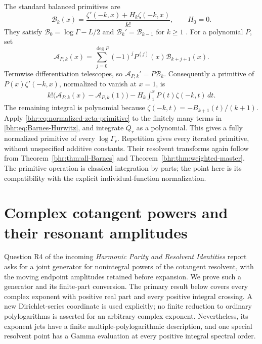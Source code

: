 \documentclass[11pt]{article}
\numberwithin{equation}{section}
\theoremstyle{plain}
\theoremstyle{definition}
\theoremstyle{remark}
\begin{document}
The standard balanced primitives are
\begin{equation}\label{bhr:eq:balanced-B}
 \mathscr B_k(x)=\frac{\zeta'(-k,x)+H_k\zeta(-k,x)}{k!},
 \qquad H_0=0.
\end{equation}
They satisfy $\mathscr B_0=\log\Gamma-L/2$ and
$\mathscr B_k'=\mathscr B_{k-1}$ for $k\ge1$
\cite{bhr:EMIntegrals,bhr:EMGeneralized}. For a polynomial $P$, set
\begin{equation}\label{bhr:eq:weighted-antiderivative}
 \mathscr A_{P,k}(x)=
    \sum_{j=0}^{\deg P}(-1)^jP^{(j)}(x)\mathscr B_{k+j+1}(x).
\end{equation}
Termwise differentiation telescopes, so
$\mathscr A_{P,k}'=P\mathscr B_k$.
Consequently a primitive of $P(x)\zeta'(-k,x)$, normalized
to vanish at $x=1$, is
\begin{align}\label{bhr:eq:normalized-zeta-primitive}
 k!\bigl(\mathscr A_{P,k}(x)-\mathscr A_{P,k}(1)\bigr)
    -H_k\int_1^xP(t)\zeta(-k,t)\,dt.
\end{align}
The remaining integral is polynomial because
$\zeta(-k,t)=-B_{k+1}(t)/(k+1)$.
Apply \eqref{bhr:eq:normalized-zeta-primitive} to the finitely many
terms in \eqref{bhr:eq:Barnes-Hurwitz}, and integrate $Q_r$ as a
polynomial. This gives a fully normalized primitive of every
$\log\Gamma_r$. Repetition gives every iterated primitive,
without unspecified additive constants. Their resolvent
transforms again follow from Theorem~\ref{bhr:thm:all-Barnes} and
Theorem~\ref{bhr:thm:weighted-master}. The primitive operation is
classical integration by parts; the point here is its compatibility
with the explicit individual-function normalization.



\section{Complex cotangent powers and their resonant amplitudes}
\label{bhr:cxp:sec:complex}

Question R4 of the incoming \emph{Harmonic Parity and Resolvent
Identities} report \cite{bhr:Parity} asks for a joint generator for nonintegral powers of
the cotangent resolvent, with the moving endpoint amplitudes retained
before expansion.  We prove such a generator and its finite-part
conversion.  The primary result below covers every complex exponent
with positive real part and every positive integral crossing.  A new
Dirichlet-series coordinate is used explicitly; no finite reduction to
ordinary polylogarithms is asserted for an arbitrary complex exponent.
Nevertheless, its exponent jets have a finite multiple-polylogarithmic
description, and one special resolvent point has a Gamma evaluation at
every positive integral spectral order.
\end{document}
